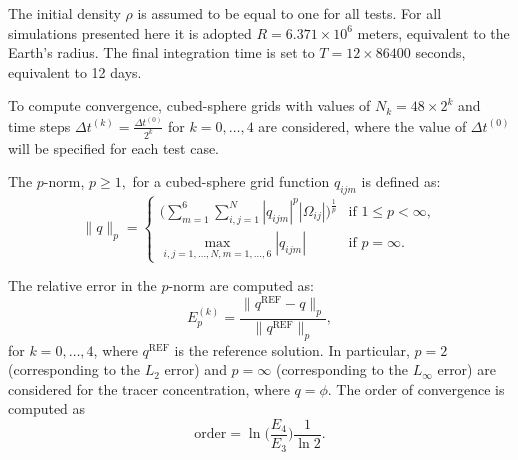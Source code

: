 \documentclass[preprint,12pt]{elsarticle}
\begin{document}
\begin{linenumbers}
The initial density $\rho$ is assumed to be equal to one for all tests.
For all simulations presented here it is adopted $R= 6.371\times 10^6$ meters, equivalent to the Earth's radius. 
The final integration time is set to $T=12 \times 86400$ seconds, equivalent to 12 days.

To compute convergence, cubed-sphere grids with values of $N_k = 48 \times 2^{k}$ and time steps $\Delta t^{(k)} = \frac{\Delta t^{(0)}}{2^k}$ for $k = 0, \ldots, 4$ are considered, where the value of $\Delta t^{(0)}$ will be specified for each test case.

The $p$-norm, $p \ge 1,$ for a cubed-sphere grid function $q_{ijm}$ is defined as:
\begin{equation}
	\label{pnorm}
	\|q\|_{p}=
	\begin{cases}
		\bigg( \sum_{m=1}^{6} \sum_{i,j=1}^{N} |q_{ijm}|^p |\Omega_{ij}|\bigg)^{\frac{1}{p}} & \text{if } 1\leq p < \infty,\\
		\max_{i,j=1, \ldots, N,m=1,\ldots,6}{|q_{ijm}|} & \text{if } p=\infty.
	\end{cases}
\end{equation}

The relative error in the $p$-norm are computed as:
\begin{equation}
	\label{error-pnorm}
	E_p^{(k)} = \frac{\|q^{\text{REF}}-q\|_p}{\|q^{\text{REF}}\|_p},
\end{equation}
for $k=0,\ldots,4$,
where $q^{\text{REF}}$ is the reference solution.
In particular, $p=2$ (corresponding to the $L_2$ error) and $p=\infty$ (corresponding to the $L_{\infty}$ error) are considered for the tracer concentration, where $q=\phi$.
The order of convergence is computed as
\begin{equation}
\text{order} = {\ln{\bigg(\frac{E_4}{E_{3}}\bigg)}}
\frac{1}{\ln{2}}.
\end{equation}


\end{linenumbers}
\end{document}
